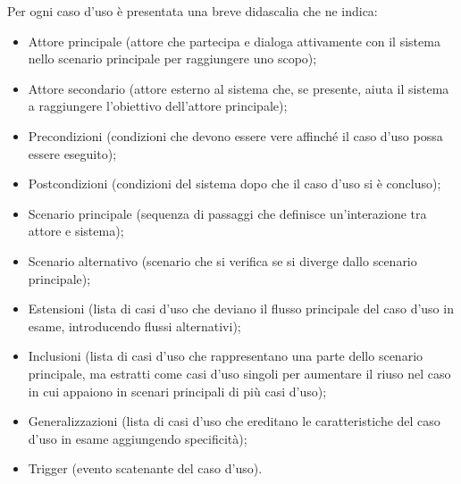 \documentclass[10pt, a4paper]{article}
\begin{document}
Per ogni caso d'uso è presentata una breve didascalia che ne indica:
\begin{itemize}
    \item Attore principale (attore che partecipa e dialoga attivamente con il sistema nello scenario principale per raggiungere uno scopo);
    \item Attore secondario (attore esterno al sistema che, se presente, aiuta il sistema a raggiungere l'obiettivo dell'attore principale);
    \item Precondizioni (condizioni che devono essere vere affinché il caso d'uso possa essere eseguito);
    \item Postcondizioni (condizioni del sistema dopo che il caso d'uso si è concluso);
    \item Scenario principale (sequenza di passaggi che definisce un'interazione tra attore e sistema);
    \item Scenario alternativo (scenario che si verifica se si diverge dallo scenario principale);
    \item Estensioni (lista di casi d'uso che deviano il flusso principale del caso d'uso in esame, introducendo flussi alternativi);
    \item Inclusioni (lista di casi d'uso che rappresentano una parte dello scenario principale, ma estratti come casi d'uso singoli per aumentare il riuso nel caso in cui appaiono in scenari principali di più casi d'uso);
    \item Generalizzazioni (lista di casi d'uso che ereditano le caratteristiche del caso d'uso in esame aggiungendo specificità);
    \item Trigger (evento scatenante del caso d'uso).
\end{itemize}
\end{document}
